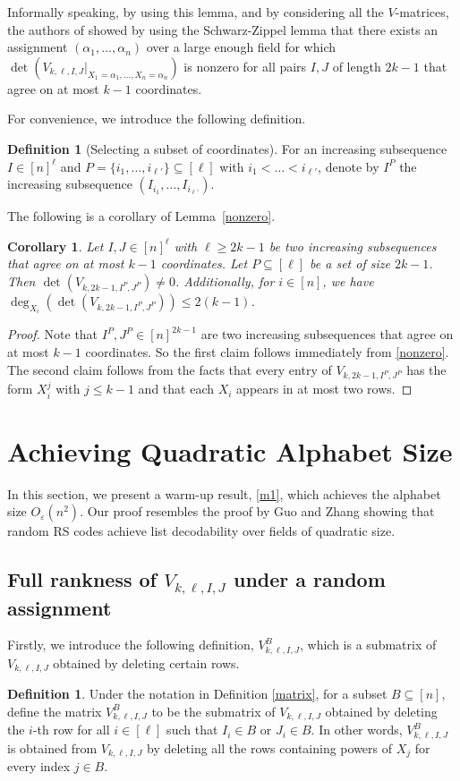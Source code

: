 \documentclass[11pt]{article}
\theoremstyle{plain}
\newtheorem{cor}[thm]{Corollary}
\theoremstyle{definition}
\newtheorem{defn}[thm]{Definition}
\theoremstyle{remark}
\newcommand{\eps}{\varepsilon}
\begin{document}
Informally speaking, by using this lemma, and by considering all the $V$-matrices, the authors of \cite{con2023reed} showed by using the Schwarz-Zippel lemma that there exists an assignment $(\alpha_1, \ldots, \alpha_n)$ over a large enough field for which $\det (V_{k,\ell,I, J}|_{X_{1}=\alpha_{1},\dots,X_{n}=\alpha_{n}})$ is nonzero for all pairs $I,J$ of length $2k-1$ that agree on at most $k-1$ coordinates.


For convenience, we introduce the following definition. 
\begin{defn}[Selecting a subset of coordinates] \label{defn:restriction}
For an increasing subsequence $I\in [n]^{\ell}$ and $P=\{i_1,\dots,i_{\ell'}\}\subseteq [\ell]$ with $i_1<\dots<i_{\ell'}$, denote by $I^P$ the increasing subsequence $(I_{i_1},\dots,I_{i_{\ell'}})$.
\end{defn}

The following is a corollary of Lemma~\ref{nonzero}.
\begin{cor}
\label{roub}
    Let $I, J \in[n]^{\ell}$ with $\ell\ge 2k-1$ be two increasing subsequences that agree on at most $k-1$ coordinates. Let $P\subseteq [\ell]$ be a set of size $2k-1$. Then $\det (V_{k,2k-1,I^P,J^P})\neq 0$. 
    Additionally, for $i\in[n]$, we have $\deg_{X_i}(\det (V_{k,2k-1,I^P,J^P}))\leq 2(k-1)$. 
\end{cor}
\begin{proof}
Note that $I^P,J^P \in[n]^{2k-1}$ are two increasing subsequences that agree on at most $k-1$ coordinates. So the first claim follows immediately from \cref{nonzero}.
The second claim follows from the facts that every entry of $ V_{k,2k-1,I^P,J^P}$ has the form $X_i^j$ with $j\leq k-1$ and that each $X_i$ appears in at most two rows. 
\end{proof}
\section{Achieving Quadratic Alphabet Size}
In this section, we present a warm-up result, \cref{m1}, which achieves the alphabet size $O_{\eps}(n^2)$. Our proof resembles the proof by Guo and Zhang \cite{GZ23} showing that random RS codes achieve list decodability over fields of quadratic size. 


\subsection{Full rankness of $V_{k,\ell,I,J}$ under a random assignment}
Firstly, we introduce the following definition, $V_{k,\ell,I,J}^{B}$, which is a submatrix of $V_{k,\ell,I,J}$ obtained by deleting certain rows. 
\begin{defn}\label{delete_B}
Under the notation in Definition \ref{matrix}, for a subset $B\subseteq [n]$, define the matrix $V_{k,\ell,I,J}^{B}$ to be the submatrix of $V_{k,\ell,I,J}$ obtained by deleting the $i$-th row for all $i\in [\ell]$ such that $I_i\in B$ or $J_i\in B$. 
In other words, $V_{k,\ell,I,J}^{B}$ is obtained from $V_{k,\ell,I,J}$ by deleting all the rows containing powers of $X_j$ for every index $j\in B$.
\end{defn}
\end{document}
